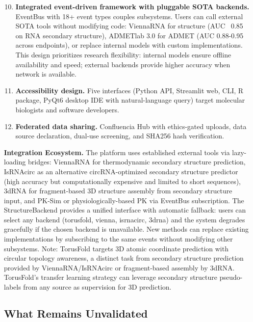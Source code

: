 \documentclass[11pt,a4paper]{article}
\begin{document}
\begin{enumerate}
\setcounter{enumi}{9}
\item \textbf{Integrated event-driven framework with pluggable SOTA backends.} EventBus with 18+ event types couples subsystems. Users can call external SOTA tools without modifying code: ViennaRNA for structure (AUC ~0.85 on RNA secondary structure), ADMETlab 3.0 for ADMET (AUC 0.88-0.95 across endpoints), or replace internal models with custom implementations. This design prioritizes research flexibility: internal models ensure offline availability and speed; external backends provide higher accuracy when network is available.

\item \textbf{Accessibility design.} Five interfaces (Python API, Streamlit web, CLI, R package, PyQt6 desktop IDE with natural-language query) target molecular biologists and software developers.

\item \textbf{Federated data sharing.} Confluencia Hub with ethics-gated uploads, data source declaration, dual-use screening, and SHA256 hash verification.
\end{enumerate}

\textbf{Integration Ecosystem.} The platform uses established external tools via lazy-loading bridges: ViennaRNA for thermodynamic secondary structure prediction, IsRNAcirc as an alternative circRNA-optimized secondary structure predictor (high accuracy but computationally expensive and limited to short sequences), 3dRNA for fragment-based 3D structure assembly from secondary structure input, and PK-Sim or physiologically-based PK via EventBus subscription. The StructureBackend provides a unified interface with automatic fallback: users can select any backend (torusfold, vienna, isrnacirc, 3drna) and the system degrades gracefully if the chosen backend is unavailable. New methods can replace existing implementations by subscribing to the same events without modifying other subsystems. Note: TorusFold targets 3D atomic coordinate prediction with circular topology awareness, a distinct task from secondary structure prediction provided by ViennaRNA/IsRNAcirc or fragment-based assembly by 3dRNA. TorusFold's transfer learning strategy can leverage secondary structure pseudo-labels from any source as supervision for 3D prediction.

\subsection{What Remains Unvalidated}
\end{document}

